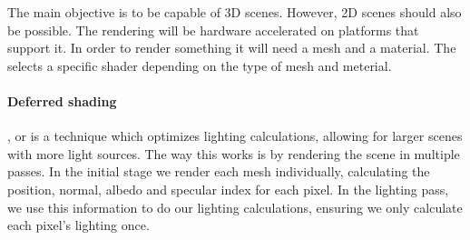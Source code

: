 The main objective is to be capable of  3D scenes.
However, 2D scenes should also be possible.
The rendering will be hardware accelerated on platforms that support it.
In order to render something it will need a mesh and a material.
The  selects a specific shader depending on the type of mesh and meterial.

\paragraph{Deferred shading}
, or  is a technique which optimizes lighting calculations,
allowing for larger scenes with more light sources.
The way this works is by rendering the scene in multiple passes.
In the initial stage we render each mesh individually,
calculating the position, normal, albedo and specular index for each pixel.
In the lighting pass,
we use this information to do our lighting calculations,
ensuring we only calculate each pixel's lighting once.\cite{deferred_shading}
